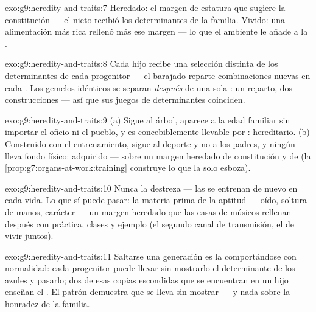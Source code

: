 \begin{solution}{exo:g9:heredity-and-traits:7}
Heredado: el margen de estatura que sugiere la constitución --- el
nieto recibió los determinantes de la familia. Vivido: una alimentación
más rica rellenó más ese margen --- lo que el ambiente le añade a la
.
\end{solution}

\begin{solution}{exo:g9:heredity-and-traits:8}
Cada hijo recibe una selección distinta de los determinantes de cada
progenitor --- el barajado reparte combinaciones nuevas en cada
. Los gemelos idénticos se separan \emph{después} de una
sola : un reparto, dos construcciones --- así que sus juegos
de determinantes coinciden.
\end{solution}

\begin{solution}{exo:g9:heredity-and-traits:9}
(a) Sigue al árbol, aparece a la edad familiar sin importar el oficio
ni el pueblo, y es concebiblemente llevable por : hereditario.
(b) Construido con el entrenamiento, sigue al deporte y no a los
padres, y ningún  lleva fondo físico: adquirido --- sobre un
margen heredado de constitución y de  (la
\cref{prop:g7:organs-at-work:training} construye lo que la 
solo esboza).
\end{solution}

\begin{solution}{exo:g9:heredity-and-traits:10}
Nunca la destreza --- las  se entrenan de nuevo en cada vida.
Lo que sí puede pasar: la materia prima de la aptitud --- oído,
soltura de manos, carácter --- un margen heredado que las casas de
músicos rellenan después con práctica, clases y ejemplo (el segundo
canal de transmisión, el de vivir juntos).
\end{solution}

\begin{solution}{exo:g9:heredity-and-traits:11}
Saltarse una generación es la  comportándose con normalidad:
cada progenitor puede llevar sin mostrarlo el determinante de los 
azules y pasarlo; dos de esas copias escondidas que se encuentran en un
hijo enseñan el . El patrón demuestra que se lleva sin mostrar ---
y nada sobre la honradez de la familia.
\end{solution}

